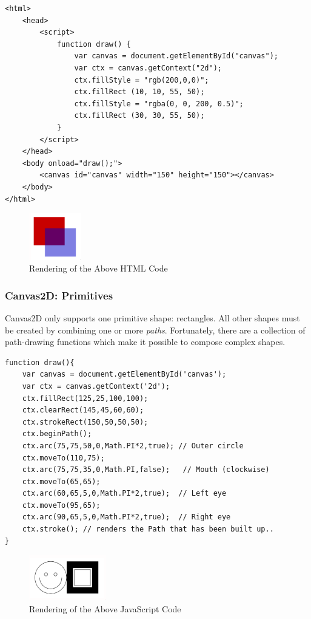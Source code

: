 \documentclass[a4paper,11pt]{article}
\begin{document}
\begin{verbatim}
<html>
    <head>
        <script>
            function draw() {
                var canvas = document.getElementById("canvas");
                var ctx = canvas.getContext("2d");
                ctx.fillStyle = "rgb(200,0,0)";
                ctx.fillRect (10, 10, 55, 50);
                ctx.fillStyle = "rgba(0, 0, 200, 0.5)";
                ctx.fillRect (30, 30, 55, 50);
            }
        </script>
    </head>
    <body onload="draw();">
        <canvas id="canvas" width="150" height="150"></canvas>
    </body>
</html>
\end{verbatim}

\begin{figure}[H]
    \centering
    \includegraphics[width=0.2\textwidth]{images/canvas_rendering_contexts.png}
    \caption{Rendering of the Above HTML Code}
\end{figure}

\subsubsection{Canvas2D: Primitives}
Canvas2D only supports one primitive shape: rectangles.
All other shapes must be created by combining one or more \textit{paths}.
Fortunately, there are a collection of path-drawing functions which make it possible to compose complex shapes.

\begin{verbatim}
function draw(){
    var canvas = document.getElementById('canvas');
    var ctx = canvas.getContext('2d');
    ctx.fillRect(125,25,100,100);
    ctx.clearRect(145,45,60,60);
    ctx.strokeRect(150,50,50,50);
    ctx.beginPath();
    ctx.arc(75,75,50,0,Math.PI*2,true); // Outer circle
    ctx.moveTo(110,75);
    ctx.arc(75,75,35,0,Math.PI,false);   // Mouth (clockwise)
    ctx.moveTo(65,65);
    ctx.arc(60,65,5,0,Math.PI*2,true);  // Left eye
    ctx.moveTo(95,65);
    ctx.arc(90,65,5,0,Math.PI*2,true);  // Right eye
    ctx.stroke(); // renders the Path that has been built up..
}
\end{verbatim}

\begin{figure}[H]
    \centering
    \includegraphics[width=0.3\textwidth]{images/canvas2d_primitives.png}
    \caption{Rendering of the Above JavaScript Code}
\end{figure}
\end{document}
